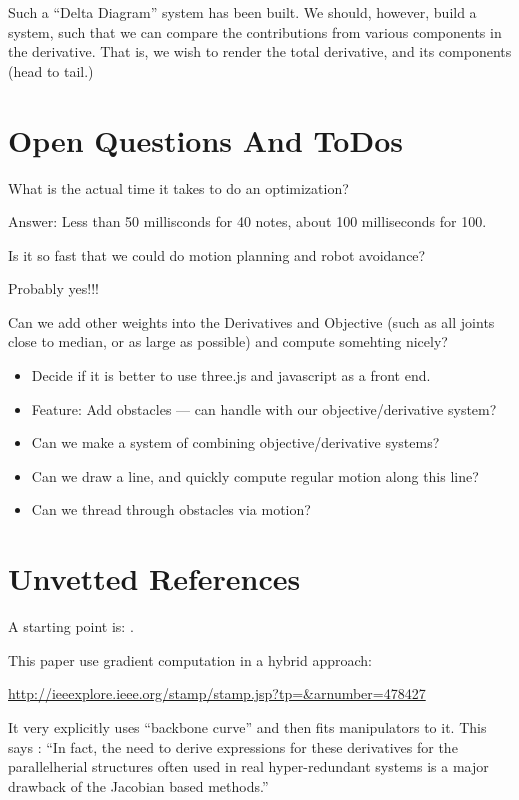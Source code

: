 \documentclass[11pt]{article}
\begin{document}
Such a ``Delta Diagram'' system has been built. We should, however, build a system, such that we can compare the contributions
from various components in the derivative. That is, we wish to render the total derivative, and its components (head to tail.)



\section{Open Questions And ToDos}

What is the actual time it takes to do an optimization?

Answer: Less than 50 millisconds for 40 notes, about 100 milliseconds for 100.

Is it so fast that we could do motion planning and robot avoidance?

Probably yes!!!

Can we add other weights into the Derivatives and Objective (such as all joints close to median, or as large as possible) and compute somehting nicely?

\begin{itemize}
\item Decide if it is better to use three.js and javascript as a front end.
\item Feature: Add obstacles --- can handle with our objective/derivative system?
\item Can we make a system of combining objective/derivative systems?
\item Can we draw a line, and quickly compute regular motion along this line?
  \item Can we thread through obstacles via motion?
\end{itemize}



\section{Unvetted References}

A starting point is: \cite{Hanahara2008}.

This paper use gradient computation in a hybrid approach:

\url{http://ieeexplore.ieee.org/stamp/stamp.jsp?tp=&arnumber=478427}

It very explicitly uses ``backbone curve'' and then fits manipulators to it.
This says :  ``In fact, the need to derive expressions for these
derivatives for the parallelherial structures often used in real
hyper-redundant systems is a major drawback of the Jacobian
based methods.''
\end{document}
